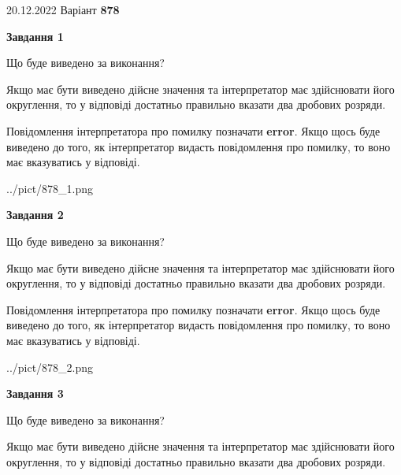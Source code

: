 \documentclass[12pt, ukrainian]{article}
\begin{document}
{20.12.2022 Варіант \No \textbf { 878 }\par}
{
\begin {Large}

{\begin {center}\textbf{Завдання 1}\end {center}}\par
Що буде виведено за виконання? \par

Якщо має бути виведено дійсне значення та інтерпретатор має здійснювати його округлення, 
то у відповіді достатньо правильно вказати два дробових розряди.

Повідомлення інтерпретатора про помилку позначати \textbf{error}.
Якщо щось буде виведено до того, як інтерпретатор видасть повідомлення про помилку, 
то воно має вказуватись у відповіді. \par

\begin{center}
	{../pict/878_1.png}
\end{center}
\newpage

{\begin {center}\textbf{Завдання 2}\end {center}}\par
Що буде виведено за виконання? \par

Якщо має бути виведено дійсне значення та інтерпретатор має здійснювати його округлення, 
то у відповіді достатньо правильно вказати два дробових розряди.

Повідомлення інтерпретатора про помилку позначати \textbf{error}.
Якщо щось буде виведено до того, як інтерпретатор видасть повідомлення про помилку, 
то воно має вказуватись у відповіді. \par

\begin{center}
	{../pict/878_2.png}
\end{center}
\newpage

{\begin {center}\textbf{Завдання 3}\end {center}}\par
Що буде виведено за виконання? \par

Якщо має бути виведено дійсне значення та інтерпретатор має здійснювати його округлення, 
то у відповіді достатньо правильно вказати два дробових розряди.


\end{Large}}
\end{document}
